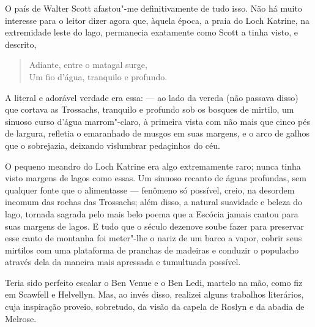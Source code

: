 O país de Walter Scott afastou"-me definitivamente de tudo isso. Não há
muito interesse para o leitor dizer agora que, àquela época, a praia do
Loch Katrine, na extremidade leste do lago, permanecia exatamente como
Scott a tinha visto, e descrito,

\begin{verse}
Adiante, entre o matagal surge,\\
Um fio d'água, tranquilo e profundo.\footnotemark
\end{verse}  

\noindent{}A literal e adorável verdade era essa: --- ao lado da vereda (não passava
disso) que cortava as Trossachs, tranquilo e profundo sob os bosques de
mirtilo, um sinuoso curso d'água marrom"-claro, à primeira vista com não
mais que cinco pés de largura, refletia o emaranhado de musgos em suas
margens, e o arco de galhos que o sobrejazia, deixando vislumbrar
pedaçinhos do céu.

O pequeno meandro do Loch Katrine era algo extremamente raro; nunca
tinha visto margens de lagos como essas. Um sinuoso recanto de águas
profundas, sem qualquer fonte que o alimentasse --- fenômeno só possível,
creio, na desordem incomum das rochas das Trossachs; além disso, a
natural suavidade e beleza do lago, tornada sagrada pelo mais belo poema
que a Escócia jamais cantou para suas margens de lagos. E tudo que o
século dezenove soube fazer para preservar esse canto de montanha foi
meter"-lhe o nariz de um barco a vapor, cobrir seus mirtilos com uma
plataforma de pranchas de madeiras e conduzir o populacho através dela
da maneira mais apressada e tumultuada possível.

Teria sido perfeito escalar o Ben Venue e o Ben Ledi, martelo na mão,
como fiz em Scawfell e Helvellyn. Mas, ao invés disso, realizei alguns
trabalhos literários, cuja inspiração proveio, sobretudo, da visão da
capela de Roslyn e da abadia de Melrose.

